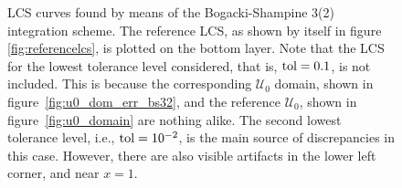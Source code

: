 \begin{figure}[htpb]
    \centering
    
    \caption[LCS curves found by means of the Bogacki-Shampine 3(2) integration
    scheme]{
        LCS curves found by means of the Bogacki-Shampine 3(2) integration
        scheme. The reference LCS, as shown by itself in figure
        \ref{fig:referencelcs}, is plotted on the bottom layer. Note that
        the LCS for the lowest tolerance level considered, that is,
        $\textnormal{tol}=0.1$,
        is not included. This is because the corresponding $\mathcal{U}_{0}$
        domain, shown in figure~\ref{fig:u0_dom_err_bs32}, and the reference
        $\mathcal{U}_{0}$, shown in figure~\ref{fig:u0_domain} are nothing
        alike. The second lowest tolerance level, i.e., $\textnormal{tol}=10^{-2}$,
        is the main source of discrepancies in this case. However, there are
        also visible artifacts in the lower left corner, and near $x=1$.}
    \label{fig:lcs_rkbs32}
\end{figure}
